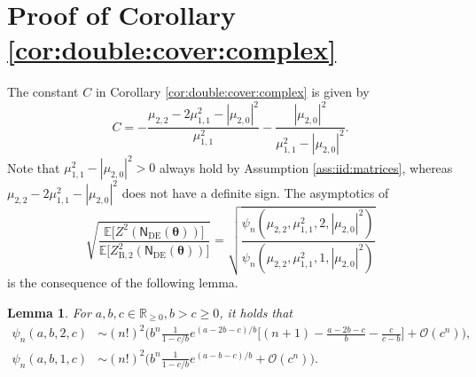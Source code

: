 \documentclass[conference]{IEEEtran}
\theoremstyle{plain}
\newtheorem{lem}[thm]{Lemma}
\theoremstyle{definition}
\providecommand{\R}{\mathbb {R}}
\newcommand{\B}{\mathrm{B}}
\newcommand{\E}{\mathbb {E}}
\newcommand{\sfn}{\mathsf{N}}
\newcommand{\btheta}{\boldsymbol{\theta}}
\newcommand{\sfnDE}{\sfn_{\mathrm{DE}}}
\begin{document}
 \section{Proof of Corollary \ref{cor:double:cover:complex}}\label{appx:double:cover:complex:asym}
 The constant $C$ in Corollary \ref{cor:double:cover:complex} is given by
 \[
  C=
  -\frac{\mu_{2,2}-2\mu_{1,1}^2-|\mu_{2,0}|^2}{\mu_{1,1}^2}
  -\frac{|\mu_{2,0}|^2}{\mu_{1,1}^2-|\mu_{2,0}|^2}.
 \]
 Note that $\mu_{1,1}^2-|\mu_{2,0}|^2>0$ always hold by Assumption
 \ref{ass:iid:matrices}, whereas $\mu_{2,2}-2\mu_{1,1}^2-|\mu_{2,0}|^2$ does
 not have a definite sign. The asymptotics of
 \[\sqrt{\frac{\E \big[Z^2(\sfnDE(\btheta))\big]}{\E \big[Z_{\B,2}^2(\sfnDE(\btheta))\big]}}
  =\sqrt{\frac{\psi_n (\mu_{2,2}, \mu_{1,1}^2, 2, |\mu_{2,0}|^2)}{\psi_n (\mu_{2,2}, \mu_{1,1}^2, 1, |\mu_{2,0}|^2)}}\]
 is the consequence of the following lemma.
 \begin{lem}
  For $a,b,c\in \R_{\geq 0}, b > c \geq0$, it holds that
  \begin{align*}
   \psi_n(a,b,2,c) & \sim (n!)^2 \Big(b^n\frac{1}{1-c/b}e^{(a-2b-c)/b}\Big [(n+1)-\frac{a-2b-c}{b}-\frac{c}{c-b} \Big]+\mathcal O(c^n)\Big), \\
   \psi_n(a,b,1,c) & \sim (n!)^2 \Big(b^n\frac{1}{1-c/b}e^{(a-b-c)/b}+\mathcal O(c^n)\Big).
  \end{align*}
 \end{lem}
\end{document}
